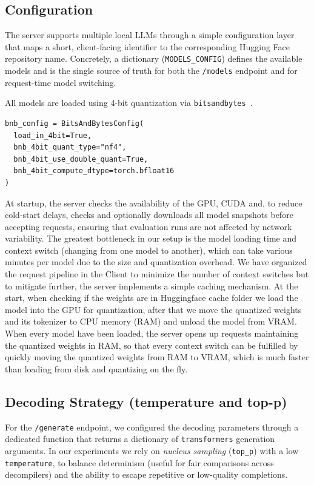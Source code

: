 \subsection{Configuration}\label{sec:configLLM}
The server supports multiple local \acp{LLM} through a simple configuration layer that maps a short, client-facing identifier to the corresponding Hugging Face repository name. 
Concretely, a dictionary (\texttt{MODELS\_CONFIG}) defines the available models and is the single source of truth for both the \texttt{/models} endpoint and for request-time model switching.

All models are loaded using 4-bit quantization via \texttt{bitsandbytes}~\cite{site:githubGitHubBitsandbytesfoundationbitsandbytes}.

\begin{verbatim}
bnb_config = BitsAndBytesConfig(
  load_in_4bit=True,
  bnb_4bit_quant_type="nf4",
  bnb_4bit_use_double_quant=True,
  bnb_4bit_compute_dtype=torch.bfloat16
)
\end{verbatim}

At startup, the server checks the availability of the \ac{GPU}, CUDA and, to reduce cold-start delays, checks and optionally downloads all model snapshots before accepting requests, ensuring that evaluation runs are not affected by network variability.
The greatest bottleneck in our setup is the model loading time and context switch (changing from one model to another), which can take various minutes per model due to the size and quantization overhead. We have organized the request pipeline in the Client to minimize the number of context switches but to mitigate further, 
the server implements a simple caching mechanism. At the start, when checking if the weights are in Huggingface cache folder we load the model into the \ac{GPU} for quantization,
after that we move the quantized weights and its tokenizer to CPU memory (RAM) and unload the model from \ac{VRAM}. When every model have been loaded, the server opens up requests maintaining the quantized weights in RAM, so that every context switch can be fulfilled by quickly moving the quantized weights from RAM to \ac{VRAM}, which is much faster than loading from disk and quantizing on the fly.

\subsection{Decoding Strategy (temperature and top-p)}
For the \texttt{/generate} endpoint, we configured the decoding parameters through a dedicated function that returns a dictionary of \texttt{transformers} generation arguments. 
In our experiments we rely on \emph{nucleus sampling} (\texttt{top\_p}) with a low \texttt{temperature}, to balance determinism (useful for fair comparisons across decompilers) 
and the ability to escape repetitive or low-quality completions.

